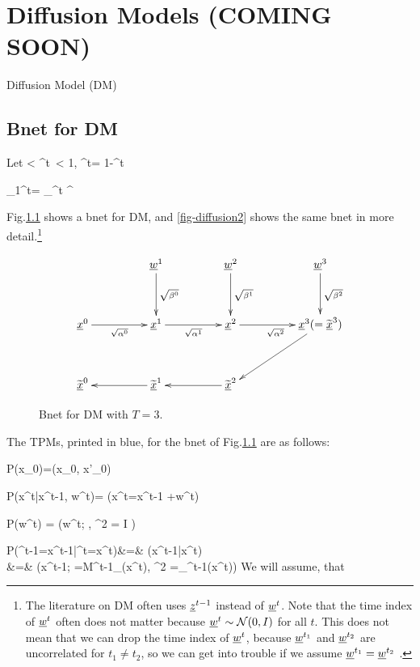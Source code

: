 \chapter{Diffusion Models (COMING SOON)}
\label{ch-diffusion}
\newcommand{\prodalp}[0]{\pi_1^t\alp}

Diffusion Model (DM)

\section{Bnet for DM}

Let
< \alp^t\
< 1, \; \beta^t= 1-\alp^t
\eeq

\beq
\prodalp= \prod_{\tau=1}^t \alp^\tau
\eeq

Fig.\ref{fig-diffusion1} shows a
bnet for DM, and  
\ref{fig-diffusion2}
shows the same bnet 
in more detail.\footnote{
The literature 
on DM
often uses ${\underline{z}}^{t-1}$ 
instead of ${\underline{w}}^{t}$.
Note that 
the time index
of 
${\underline{w}}^{t}$
often does not matter
because 
${\underline{w}}^{t}\sim {\cal N}(0, I)$
for all $t$.
This does not mean
that we can drop the
time index of ${\underline{w}}^t$,
because ${\underline{w}}^{t_1}$
and ${\underline{w}}^{t_2}$
are uncorrelated for $t_1\neq t_2$,
so we can get into 
trouble if we assume
${\underline{w}}^{t_1}={\underline{w}}^{t_2}$ .
}

\begin{figure}[h!]
$$
\xymatrix@C=4pc@R=3pc{
&\rvw^1\ar[d]^{\sqrt{\beta^0}}
&\rvw^2\ar[d]^{\sqrt{\beta^1}}
&\rvw^3\ar[d]^{\sqrt{\beta^2}}
\\
\rvx^0\ar[r]_{\sqrt{\alp^0}}
&\rvx^1\ar[r]_{\sqrt{\alp^1}}
&\rvx^2\ar[r]_{\sqrt{\alp^2}}
&\rvx^3(= \TIL{\rvx}^3)\ar[dl]
\\
\TIL{\rvx}^0
&\TIL{\rvx}^1\ar[l]
&\TIL{\rvx}^2\ar[l]
&
}
$$
\caption{Bnet for DM with $T=3$.}
\label{fig-diffusion1}
\end{figure}


The TPMs, printed in blue,
for the bnet of Fig.\ref{fig-diffusion1}
are as follows:

\beq \color{blue}
P(x_0)=\delta(x_0, x'_0)
\quad {}
\eeq

\beq \color{blue}
P(x^t|x^{t-1}, w^{t})=
\indi(\quad x^t=\;x^{t-1}
+\;w^{t}\quad)
\eeq

\beq \color{blue}
P(w^t) = \caln(w^t; ,
 \s^2 =  I ) \quad {}
\eeq

\beqa \color{blue}
P(\TIL{\rvx}^{t-1}=x^{t-1}|\TIL{\rvx}^{t}=x^{t})&=&\color{blue}
\tilPT(x^{t-1}|x^{t})
\\
&=&\color{blue}
\caln(x^{t-1}; \mu=M^{t-1}_\theta(x^t),
\s^2 =\Sigma_\theta^{t-1}(x^t))
 \eeqa
We will assume,
that 


